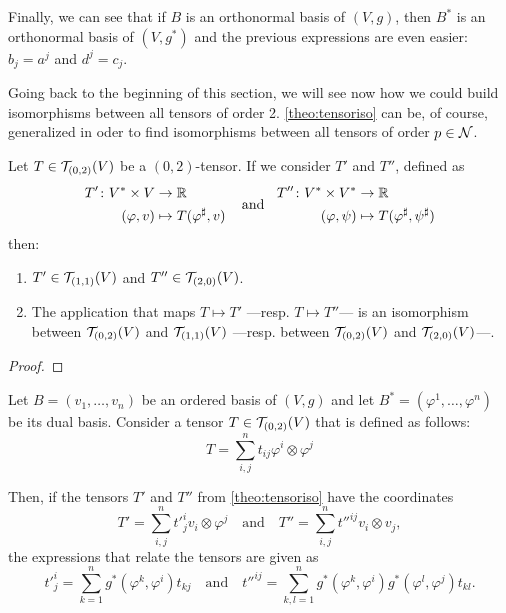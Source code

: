 Finally, we can see that if $B$ is an orthonormal basis of $(V,g)$, then $B^*$ is an orthonormal basis of $(V,g^*)$ and the previous expressions are even easier: $b_j = a^j$ and $d^j = c_j$.

Going back to the beginning of this section, we will see now how we could build isomorphisms between all tensors of order 2. \autoref{theo:tensoriso} can be, of course, generalized in oder to find isomorphisms between all tensors of order $p \in {\mathcal N}$.

\begin{theorem}
	\label{theo:tensoriso}
	Let $T\in{\mathcal T}_{(0,2)}(V)$ be a $(0,2)$-tensor. If we consider $T'$ and $T''$, defined as
	\[	
	\begin{aligned}
	T' \colon V^* \times V &\to \mathbb{R} \\
	(\varphi, v) &\mapsto T(\varphi^\sharp, v)
	\end{aligned} \;\;\;\textrm{ and }\;\;
	\begin{aligned}
	T'' \colon V^* \times V^* &\to \mathbb{R} \\
	(\varphi, \psi) &\mapsto T(\varphi^\sharp, \psi^\sharp)
	\end{aligned}
	\]
	then:
	\begin{enumerate}
		\item $T'\in{\mathcal T}_{(1,1)}(V)$ and $T''\in{\mathcal T}_{(2,0)}(V)$.
		\item The application that maps $T \mapsto T'$ ---resp. $T \mapsto T''$--- is an isomorphism between ${\mathcal T}_{(0,2)}(V)$ and ${\mathcal T}_{(1,1)}(V)$ ---resp. between ${\mathcal T}_{(0,2)}(V)$ and ${\mathcal T}_{(2,0)}(V)$---.
	\end{enumerate}
\end{theorem}

\begin{proof}
\end{proof}

\begin{proposition}
	\label{pro:musicalcoord}
	Let $B = (v_1, \dots, v_n)$ be an ordered basis of $(V,g)$ and let $B^* = (\varphi^1, \dots, \varphi^n)$ be its dual basis. Consider a tensor $T\in{\mathcal T}_{(0,2)}(V)$ that is defined as follows:
	\[
		T = \sum_{i,j}^{n} t_{ij} \varphi^i \otimes \varphi^j
	\]
	
	Then, if the tensors $T'$ and $T''$ from \autoref{theo:tensoriso} have the coordinates
	\[
		T' = \sum_{i,j}^{n} t'^i_j v_i \otimes \varphi^j
		\quad \textrm{and} \quad
		T'' = \sum_{i,j}^{n} t''^{ij} v_i \otimes v_j,
	\]
	the expressions that relate the tensors are given as
	\[
		t'^i_j = \sum_{k=1}^n g^*(\varphi^k, \varphi^i) t_{kj}
		\quad \textrm{and} \quad
		t''^{ij} = \sum_{k,l = 1}^n g^*(\varphi^k, \varphi^i) g^*(\varphi^l, \varphi^j) t_{kl}.
	\]
\end{proposition}

